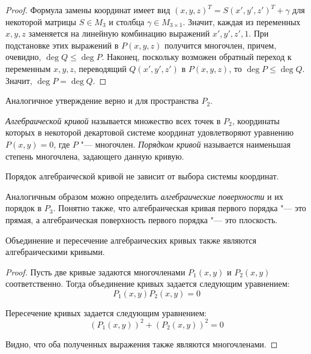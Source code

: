 \begin{proof}
	Формула замены координат имеет вид $(x, y, z)^T = S(x', y', z')^T + \gamma$ для некоторой матрицы $S \in M_3$ и столбца $\gamma \in M_{3 \times 1}$. Значит, каждая из переменных $x, y, z$ заменяется на линейную комбинацию выражений $x', y', z', 1$. При подстановке этих выражений в $P(x, y, z)$ получится многочлен, причем, очевидно, $\deg{Q} \le \deg{P}$. Наконец, поскольку возможен обратный переход к переменным $x, y, z$, переводящий $Q(x', y', z')$ в $P(x, y, z)$, то $\deg{P} \le \deg{Q}$. Значит, $\deg{P} = \deg{Q}$.
\end{proof}

\begin{note}
	Аналогичное утверждение верно и для пространства $P_2$.
\end{note}

\begin{definition}
	\textit{Алгебраической кривой} называется множество всех точек в $P_2$, координаты которых в некоторой декартовой системе координат удовлетворяют уравнению $P(x, y) = 0$, где $P$ "--- многочлен. \textit{Порядком кривой} называется наименьшая степень многочлена, задающего данную кривую.
\end{definition}

\begin{note}
	Порядок алгебраической кривой не зависит от выбора системы координат.
\end{note}

\begin{note}
	Аналогичным образом можно определить \textit{алгебраические поверхности} и их порядок в $P_3$. Понятно также, что алгебраическая кривая первого порядка "--- это прямая, а алгебраическая поверхность первого порядка "--- это плоскость.
\end{note}

\begin{proposition}
	Объединение и пересечение алгебраических кривых также являются алгебраическими кривыми.
\end{proposition}

\begin{proof}
	Пусть две кривые задаются многочленами $P_1(x, y)$ и $P_2(x, y)$ соответственно. Тогда объединение кривых задается следующим уравнением:
	\[
	P_1(x, y)P_2(x, y) = 0\]
	
	\pagebreak
	Пересечение кривых задается следующим уравнением:
	\[
	(P_1(x, y))^2 + (P_2(x, y))^2 = 0
	\]
	
	Видно, что оба полученных выражения также являются многочленами.
\end{proof}

